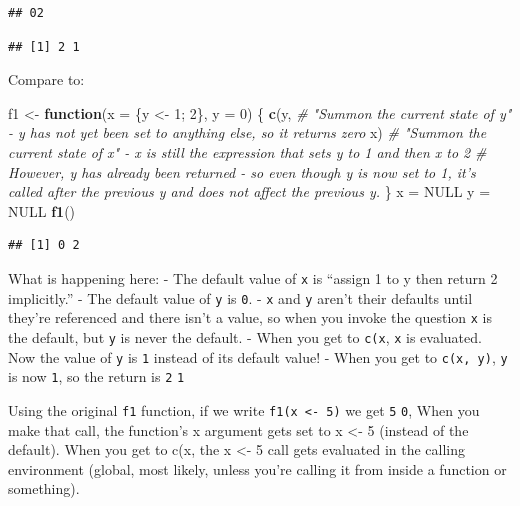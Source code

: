 \documentclass[]{book}
\newenvironment{Shaded}{\begin{snugshade}}{\end{snugshade}}
\newcommand{\CommentTok}[1]{\textcolor[rgb]{0.56,0.35,0.01}{\textit{#1}}}
\newcommand{\ControlFlowTok}[1]{\textcolor[rgb]{0.13,0.29,0.53}{\textbf{#1}}}
\newcommand{\DataTypeTok}[1]{\textcolor[rgb]{0.13,0.29,0.53}{#1}}
\newcommand{\DecValTok}[1]{\textcolor[rgb]{0.00,0.00,0.81}{#1}}
\newcommand{\KeywordTok}[1]{\textcolor[rgb]{0.13,0.29,0.53}{\textbf{#1}}}
\newcommand{\NormalTok}[1]{#1}
\newcommand{\OtherTok}[1]{\textcolor[rgb]{0.56,0.35,0.01}{#1}}
\newcommand{\StringTok}[1]{\textcolor[rgb]{0.31,0.60,0.02}{#1}}
\begin{document}
\begin{verbatim}
## 02
\end{verbatim}

\begin{verbatim}
## [1] 2 1
\end{verbatim}

Compare to:

\begin{Shaded}
\begin{Highlighting}[]
\NormalTok{f1 <-}\StringTok{ }\ControlFlowTok{function}\NormalTok{(}\DataTypeTok{x =}\NormalTok{ \{y <-}\StringTok{ }\DecValTok{1}\NormalTok{; }\DecValTok{2}\NormalTok{\}, }\DataTypeTok{y =} \DecValTok{0}\NormalTok{) \{}
  \KeywordTok{c}\NormalTok{(y, }\CommentTok{# "Summon the current state of y" - y has not yet been set to anything else, so it returns zero}
\NormalTok{    x) }\CommentTok{# "Summon the current state of x" - x is still the expression that sets y to 1 and then x to 2}
       \CommentTok{# However, y has already been returned - so even though y is now set to 1, it's called after the previous y and does not affect the previous y.}
\NormalTok{\}}
\NormalTok{x =}\StringTok{ }\OtherTok{NULL}
\NormalTok{y =}\StringTok{ }\OtherTok{NULL}
\KeywordTok{f1}\NormalTok{()}
\end{Highlighting}
\end{Shaded}

\begin{verbatim}
## [1] 0 2
\end{verbatim}

What is happening here:
- The default value of \texttt{x} is ``assign 1 to y then return 2 implicitly.''
- The default value of \texttt{y} is \texttt{0}.
- \texttt{x} and \texttt{y} aren't their defaults until they're referenced and there isn't a value, so when you invoke the question \texttt{x} is the default, but \texttt{y} is never the default.
- When you get to \texttt{c(x}, \texttt{x} is evaluated. Now the value of \texttt{y} is \texttt{1} instead of its default value!
- When you get to \texttt{c(x,\ y)}, \texttt{y} is now \texttt{1}, so the return is \texttt{2} \texttt{1}

Using the original \texttt{f1} function, if we write \texttt{f1(x\ \textless{}-\ 5)} we get \texttt{5} \texttt{0}, When you make that call, the function's x argument gets set to x \textless{}- 5 (instead of the default). When you get to c(x, the x \textless{}- 5 call gets evaluated in the calling environment (global, most likely, unless you're calling it from inside a function or something).
\end{document}
